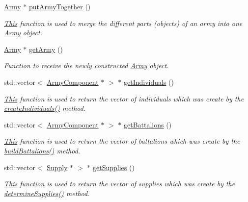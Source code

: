 \begin{DoxyCompactItemize}
\mbox{\hyperlink{class_army}{Army}} $\ast$ \mbox{\hyperlink{class_army_builder_a0a813968845cf859ba06a091d4c48385}{put\+Army\+Together}} ()
\begin{DoxyCompactList}\small\item\em \mbox{\hyperlink{class_this}{This}} function is used to merge the different parts (objects) of an army into one \mbox{\hyperlink{class_army}{Army}} object. \end{DoxyCompactList}\item 
\mbox{\hyperlink{class_army}{Army}} $\ast$ \mbox{\hyperlink{class_army_builder_a4a9b287a30f22d84cd30474edbeec24e}{get\+Army}} ()
\begin{DoxyCompactList}\small\item\em Function to receive the newly constructed \mbox{\hyperlink{class_army}{Army}} object. \end{DoxyCompactList}\item 
std\+::vector$<$ \mbox{\hyperlink{class_army_component}{Army\+Component}} $\ast$ $>$ $\ast$ \mbox{\hyperlink{class_army_builder_acfd27d8925670504e95c8cc62b560dfb}{get\+Individuals}} ()
\begin{DoxyCompactList}\small\item\em \mbox{\hyperlink{class_this}{This}} function is used to return the vector of individuals which was create by the \mbox{\hyperlink{class_army_builder_aefae08ee6f43f41d94d06891ad6fdbbb}{create\+Individuals()}} method. \end{DoxyCompactList}\item 
std\+::vector$<$ \mbox{\hyperlink{class_army_component}{Army\+Component}} $\ast$ $>$ $\ast$ \mbox{\hyperlink{class_army_builder_a9a2e7c35c1565bd2f15f2174457f220a}{get\+Battalions}} ()
\begin{DoxyCompactList}\small\item\em \mbox{\hyperlink{class_this}{This}} function is used to return the vector of battalions which was create by the \mbox{\hyperlink{class_army_builder_a4ff1c6808926f65820eceaf9adab2c16}{build\+Battalions()}} method. \end{DoxyCompactList}\item 
std\+::vector$<$ \mbox{\hyperlink{class_supply}{Supply}} $\ast$ $>$ $\ast$ \mbox{\hyperlink{class_army_builder_a48c19e9705bc720eec8f93f21ed15c55}{get\+Supplies}} ()
\begin{DoxyCompactList}\small\item\em \mbox{\hyperlink{class_this}{This}} function is used to return the vector of supplies which was create by the \mbox{\hyperlink{class_army_builder_ae999bf5bc4c83243f2d000e6f981c986}{determine\+Supplies()}} method. \end{DoxyCompactList}\item 

\end{DoxyCompactItemize}

